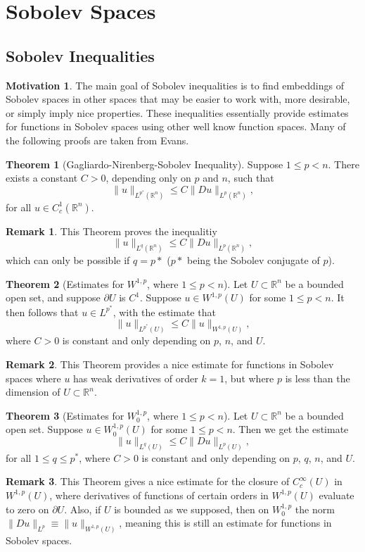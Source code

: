\documentclass[11pt]{article}
\theoremstyle{definition}
\newtheorem*{theorem}{Theorem}
\newtheorem*{remark}{Remark}
\newtheorem*{motivation}{Motivation}
\begin{document}
\newpage

\section{Sobolev Spaces}
\subsection{Sobolev Inequalities}
\begin{motivation}
The main goal of Sobolev inequalities is to find embeddings of Sobolev spaces in other spaces that may be easier to work with, more desirable,
or simply imply nice properties. These inequalities essentially provide estimates for functions in Sobolev spaces using other
well know function spaces. Many of the following proofs are taken from Evans.
\end{motivation}
\begin{theorem}[Gagliardo-Nirenberg-Sobolev Inequality]
Suppose $1\leq p < n$. There exists a constant $C > 0$, depending only on $p$ and $n$, such that
	\[\|u\|_{L^{p^*}(\mathbb{R}^n)} \leq C\|Du\|_{L^{p}(\mathbb{R}^n)},\]
for all $u \in C_{c}^{1}(\mathbb{R}^n)$.
\end{theorem}
\begin{remark}
This Theorem proves the inequalitiy
	\[\|u\|_{L^{q}(\mathbb{R}^n)} \leq C\|Du\|_{L^{p}(\mathbb{R}^n)},\]
which can only be possible if $q=p*$ ($p*$ being the Sobolev conjugate of $p$).
\end{remark}

\begin{theorem}[Estimates for $W^{1,p}$, where $1 \leq p < n$]
Let $U \subset \mathbb{R}^n$ be a bounded open set, and suppose $\partial U$ is $C^1$.
Suppose $u \in W^{1,p}(U)$ for some $1 \leq p < n$. It then follows that $u \in L^{p^*}$, with the estimate that
	\[\|u\|_{L^{p^*}(U)} \leq C\|u\|_{W^{1,p}(U)},\]
where $C > 0$ is constant and only depending on $p$, $n$, and $U$.
\end{theorem}
\begin{remark}
This Theorem provides a nice estimate for functions in Sobolev spaces where $u$ has weak derivatives of order $k = 1$,
but where $p$ is less than the dimension of $U \subset \mathbb{R}^n$.
\end{remark}

\begin{theorem}[Estimates for $W_{0}^{1,p}$, where $1 \leq p < n$]
Let $U \subset \mathbb{R}^n$ be a bounded open set.
	Suppose $u \in W_{0}^{1,p}(U)$ for some $1 \leq p < n$. Then we get the estimate
	\[\|u\|_{L^{q}(U)} \leq C\|Du\|_{L^{p}(U)},\]
for all $1 \leq q \leq p^*$, where $C > 0$ is constant and only depending on $p$, $q$, $n$, and $U$.
\end{theorem}
\begin{remark}
This Theorem gives a nice estimate for the closure of $C_{c}^{\infty}(U)$ in $W^{1,p}(U)$,
where derivatives of functions of certain orders in $W^{1,p}(U)$ evaluate to zero on $\partial U$.
Also, if $U$ is bounded as we supposed, then on $W_{0}^{1,p}$ the norm $\|Du\|_{L^{p}} \equiv \|u\|_{W^{1,p}(U)}$,
meaning this is still an estimate for functions in Sobolev spaces.
\end{remark}
\end{document}
